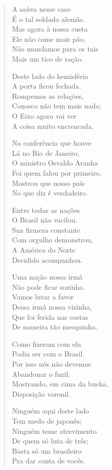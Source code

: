 \begin{verse}
A saúva nesse caso\\
É o tal soldado alemão.\\
Mas agora à nossa custa\\
Ele não come mais pão,\\
Não mandamos para os tais\\
Mais um tico de ração.

Deste lado do hemisfério\\
A porta ficou fechada.\\
Rompemos as relações,\\
Conosco não tem mais nada;\\
O Eixo agora vai ver\\
A coisa muito encrencada.
\pagebreak

Na conferência que houve\\
Lá no Rio de Janeiro,\\
O ministro Osvaldo Aranha\\
Foi quem falou por primeiro,\\
Mostrou que nosso país\\
No que diz é verdadeiro.

Entre todas as nações\\
O Brasil não vacilou.\\
Sua firmeza constante\\
Com orgulho demonstrou,\\
A América do Norte\\
Decidido acompanhou.

Uma nação nossa irmã\\
Não pode ficar sozinha.\\
Vamos lutar a favor\\
Dessa irmã nossa vizinha,\\
Que foi ferida nas costas\\
De maneira tão mesquinha.

Como fizeram com ela\\
Podia ser com o Brasil.\\
Por isso nós não devemos\\
Abandonar o fuzil,\\
Mostrando, em cima da bucha,\\
Disposição varonil.
\pagebreak

Ninguém aqui deste lado\\
Tem medo de japonês;\\
Ninguém teme atrevimento\\
De quem só luta de três;\\
Basta só um brasileiro\\
Pra dar conta de vocês.


\end{verse}

